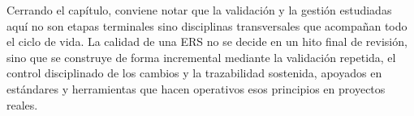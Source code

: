 \documentclass[11pt,a4paper,oneside]{report}
\begin{document}
	Cerrando el cap\'itulo, conviene notar que la validaci\'on y la gesti\'on estudiadas aqu\'i no son etapas terminales sino disciplinas transversales que acompa\~nan todo el ciclo de vida. La calidad de una ERS no se decide en un hito final de revisi\'on, sino que se construye de forma incremental mediante la validaci\'on repetida, el control disciplinado de los cambios y la trazabilidad sostenida, apoyados en est\'andares y herramientas que hacen operativos esos principios en proyectos reales.
	
	
	
	
\end{document}
